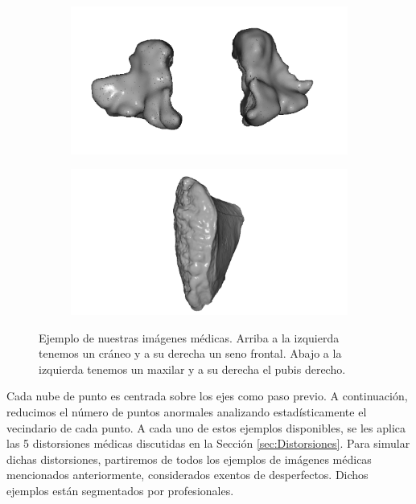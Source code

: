 \begin{figure}[htp]
  \begin{subfigure}[b]{0.40\textwidth}
  \centering 
  \includegraphics[width=\textwidth]{imagenes/chapter4/Maxilar100205.png}
  \end{subfigure}
  \begin{subfigure}[b]{0.40\textwidth}
  \centering 
  \includegraphics[width=\textwidth]{imagenes/chapter4/PubisDch.png}
  \end{subfigure}
  \caption[Ejemplo de nuestras imágenes médicas.]{Ejemplo de nuestras imágenes médicas.
  Arriba a la izquierda tenemos un cráneo y a su derecha un seno frontal. 
  Abajo a la izquierda tenemos un maxilar y a su derecha el pubis derecho.}
  \label{fig:OurDataExample}
\end{figure}


Cada nube de punto es centrada sobre los ejes como paso previo. A continuación, 
reducimos el número de puntos anormales analizando estadísticamente el vecindario de cada punto. 
A cada uno de estos ejemplos disponibles, se les aplica las 5 distorsiones médicas
discutidas en la Sección \ref{sec:Distorsiones}. 
Para simular dichas distorsiones, partiremos de todos los ejemplos de imágenes médicas 
mencionados anteriormente, considerados exentos de desperfectos. Dichos ejemplos 
están segmentados por profesionales. 

